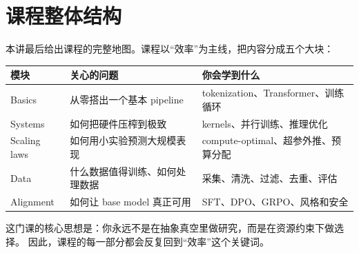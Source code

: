 \section{课程整体结构}

本讲最后给出课程的完整地图。课程以“效率”为主线，把内容分成五个大块：

\begin{table}[H]
\centering
\begin{tabular}{p{2.2cm}p{4.1cm}p{6.8cm}}
\toprule
\textbf{模块} & \textbf{关心的问题} & \textbf{你会学到什么} \\
\midrule
Basics & 从零搭出一个基本 pipeline & tokenization、Transformer、训练循环 \\
Systems & 如何把硬件压榨到极致 & kernels、并行训练、推理优化 \\
Scaling laws & 如何用小实验预测大规模表现 & compute-optimal、超参外推、预算分配 \\
Data & 什么数据值得训练、如何处理数据 & 采集、清洗、过滤、去重、评估 \\
Alignment & 如何让 base model 真正可用 & SFT、DPO、GRPO、风格和安全 \\
\bottomrule
\end{tabular}
\end{table}

这门课的核心思想是：你永远不是在抽象真空里做研究，而是在资源约束下做选择。
因此，课程的每一部分都会反复回到“效率”这个关键词。

